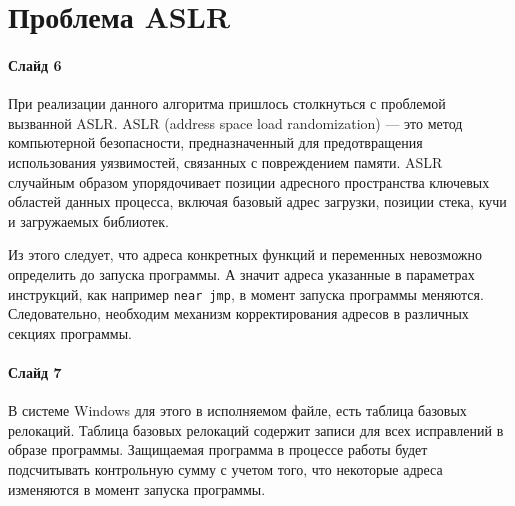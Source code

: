 
\section{Проблема ASLR}

\paragraph{Слайд 6}\mbox{}\par

При реализации данного алгоритма пришлось столкнуться с проблемой вызванной
ASLR. ASLR (address space load randomization) --- это метод компьютерной
безопасности, предназначенный для предотвращения использования уязвимостей,
связанных с повреждением памяти. ASLR случайным образом упорядочивает позиции
адресного пространства ключевых областей данных процесса, включая базовый адрес
загрузки, позиции стека, кучи и загружаемых библиотек.

Из этого следует, что адреса конкретных функций и переменных невозможно
определить до запуска программы. А значит адреса указанные в параметрах
инструкций, как например \verb!near jmp!, в момент запуска программы меняются.
Следовательно, необходим механизм корректирования адресов в различных секциях
программы.

\paragraph{Слайд 7}\mbox{}\par

В системе Windows для этого в исполняемом файле, есть таблица базовых
релокаций. Таблица базовых релокаций содержит записи для всех исправлений в
образе программы. Защищаемая программа в процессе работы будет подсчитывать
контрольную сумму с учетом того, что некоторые адреса изменяются в момент
запуска программы.
